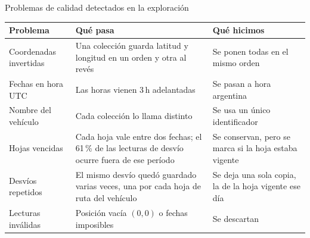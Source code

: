 \documentclass[aspectratio=169,10pt]{beamer}
\begin{document}
\begin{frame}{Problemas de calidad detectados en la exploración}
  \begingroup\small
  \renewcommand{\arraystretch}{1.35}
  \begin{tabularx}{\textwidth}{@{}L{3.6cm}YY@{}}
    \toprule
    \textbf{Problema} & \textbf{Qué pasa} & \textbf{Qué hicimos} \\
    \midrule
    Coordenadas invertidas & Una colección guarda latitud y longitud en un orden y otra al revés & Se ponen todas en el mismo orden \\
    Fechas en hora UTC & Las horas vienen 3\,h adelantadas & Se pasan a hora argentina \\
    Nombre del vehículo & Cada colección lo llama distinto & Se usa un único identificador \\
    Hojas vencidas & Cada hoja vale entre dos fechas; el 61\,\% de las lecturas de desvío ocurre fuera de ese período & Se conservan, pero se marca si la hoja estaba vigente \\
    Desvíos repetidos & El mismo desvío quedó guardado varias veces, una por cada hoja de ruta del vehículo & Se deja una sola copia, la de la hoja vigente ese día \\
    Lecturas inválidas & Posición vacía $(0,0)$ o fechas imposibles & Se descartan \\
    \bottomrule
  \end{tabularx}\endgroup
\end{frame}

\end{document}
